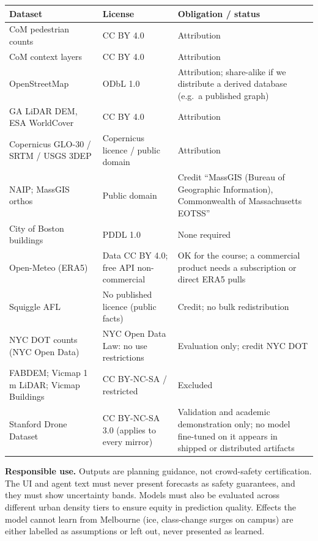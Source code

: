 \documentclass[11pt]{article}
\newcommand{\hrow}{\rowcolor{headgray}}
\begin{document}
\begin{xltabular}{\linewidth}{|L{4.4cm}|L{4.2cm}|Y|}
\hline\hrow
\textbf{Dataset} & \textbf{License} & \textbf{Obligation / status} \\\hline
\endhead
CoM pedestrian counts & CC BY 4.0 & Attribution \\\hline
CoM context layers & CC BY 4.0 & Attribution \\\hline
OpenStreetMap & ODbL 1.0 & Attribution; share-alike if we distribute a derived database (e.g.\ a published graph) \\\hline
GA LiDAR DEM, ESA WorldCover & CC BY 4.0 & Attribution \\\hline
Copernicus GLO-30 / SRTM / USGS 3DEP & Copernicus licence / public domain & Attribution \\\hline
NAIP; MassGIS orthos & Public domain & Credit ``MassGIS (Bureau of Geographic Information), Commonwealth of Massachusetts EOTSS'' \\\hline
City of Boston buildings & PDDL 1.0 & None required \\\hline
Open-Meteo (ERA5) & Data CC BY 4.0; free API non-commercial & OK for the course; a commercial product needs a subscription or direct ERA5 pulls \\\hline
Squiggle AFL & No published licence (public facts) & Credit; no bulk redistribution \\\hline
NYC DOT counts (NYC Open Data) & NYC Open Data Law: no use restrictions & Evaluation only; credit NYC DOT \\\hline
FABDEM; Vicmap 1\,m LiDAR; Vicmap Buildings & CC BY-NC-SA / restricted & Excluded \\\hline
Stanford Drone Dataset & CC BY-NC-SA 3.0 (applies to every mirror) & Validation and academic demonstration only; no model fine-tuned on it appears in shipped or distributed artifacts \\\hline
\end{xltabular}

\textbf{Responsible use.} Outputs are planning guidance, not crowd-safety certification. The UI and agent text must never present forecasts as safety guarantees, and they must show uncertainty bands. Models must also be evaluated across different urban density tiers to ensure equity in prediction quality. Effects the model cannot learn from Melbourne (ice, class-change surges on campus) are either labelled as assumptions or left out, never presented as learned.

\end{document}

